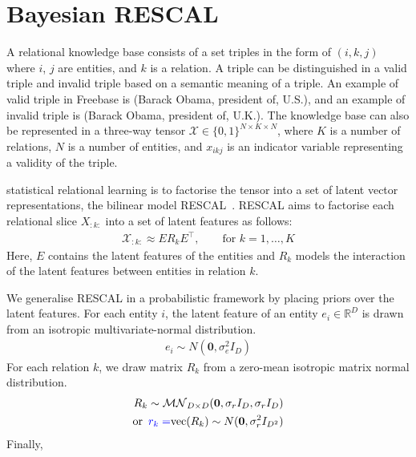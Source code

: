 \section{Bayesian RESCAL}
A relational knowledge base consists of a set triples in the form of $(i, k, j)$ 
where $i$, $j$ are entities, and $k$ is a relation. A triple can be distinguished 
in a valid triple and invalid triple based on a semantic meaning of a triple. An 
example of valid triple in Freebase is (Barack Obama, president of, U.S.), and an 
example of invalid triple is (Barack Obama, president of, U.K.).
The knowledge base can also be represented in a three-way tensor 
$\mathcal{X} \in \{0, 1\}^{N \times K \times N}$, where $K$ is a number of 
relations, $N$ is a number of entities, and $x_{ikj}$ is an indicator variable 
representing a validity of the triple. 

 statistical relational learning is to factorise the tensor into a 
set of latent vector representations,  the bilinear model RESCAL~\cite{nickel2011three}.
RESCAL 
aims to factorise each relational slice $X_{:k:}$ into a set of  latent 
features as follows:
\begin{align}
\mathcal{X}_{:k:} \approx E R_k E^\top, \qquad \text{for } k = 1, \dots, K
\end{align}
Here, $E$ contains the latent features of the 
entities and $R_k$  models the interaction of the 
latent features between entities in relation $k$.

We generalise RESCAL in a probabilistic framework by placing priors over the 
latent features. For each entity $i$, the latent feature of an entity $e_i \in 
\mathbb{R}^{D}$ is drawn from an isotropic multivariate-normal distribution.
\begin{align}
\label{eqn:entity_gen}
e_i \sim {N}(\mathbf{0}, \sigma_e^2{I}_D)
\end{align}
For each relation $k$, we draw matrix $R_k$ from 
a zero-mean isotropic matrix normal distribution.
\begin{align}
\label{eqn:relation_gen}
R_k \sim \mathcal{MN}_{D \times D}(\mathbf{0}, \sigma_r{I}_D, \sigma_r{I}_D) \\
\text{or}\enspace {\color{blue}{r_k  =}} \text{vec}(R_k) \sim N(\mathbf{0}, \sigma_r^2 I_{D^2}) \notag
\end{align} %
Finally, 


